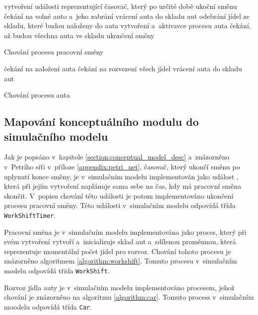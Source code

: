 \documentclass[a4paper, 11pt]{article}
\begin{document}
	\begin{algorithm}[ht]

		vytvoření události reprezentující časovač, který po určité době
		ukoční směnu\;
		{
			čekání na volné auto a~jeho zabrání\;
			{
				vrácení auta do skladu aut\;
				\Break\;
			}
			{
				odebrání jídel ze skladu, které budou naloženy do auta\;
				vytvoření a~aktivavce procesu auta\;
			}
		}
		čekání, až budou všechna auta ve skladu\;
		ukončení směny\;

		\caption{Chování procesu pracovní směny}
		\label{algorithm:workshift}
	\end{algorithm}

	\begin{algorithm}[ht]
		čekání na naložení auta\;
		čekání na rozvezení všech jídel\;
		vrácení auta do skladu aut\;

		\caption{Chování procesu auta}
		\label{algorithm:car}
	\end{algorithm}


	\subsection{Mapování konceptuálního modulu do simulačního modelu}

	Jak je popsáno v~kapitole \ref{section:conceptual_model_desc}
	a~znázorněno v~Petriho síťi v~příloze \ref{appendix:petri_net}, časovač,
	který ukončí směnu po uplynutí konce směny, je v~simulačním modelu
	implementován jako událost \cite[snímek 169]{IMS_slides}, která
	při jejím vytvoření naplánuje sama sebe na čas, kdy má pracovní směna
	skončit. V~popisu chování této události je potom implementováno
	ukončení procesu pracovní směny. Této události v~simulačním modelu
	odpovídá třída \texttt{WorkShiftTimer}.

	Pracovní směna je v~simulačním modelu implementována jako proces, který
	při svém vytvoření vytvoří a~inicializuje sklad
	\cite[snímek 184]{IMS_slides} aut a~sdílenou proměnnou, která reprezentuje
	momentální počet jídel pro rozvoz. Chování tohoto procesu
	je znázorněno algoritmem \ref{algorithm:workshift}. Tomuto procesu
	v~simulačním modelu odpovídá třída \texttt{WorkShift}.

	Rozvoz jídla auty je v~simulačním modelu implementováno procesem, jehož
	chování je znázorněno na algoritmu \ref{algorithm:car}. Tomuto process
	v~simulačním moodelu odpovídá třída \texttt{Car}.
\end{document}
